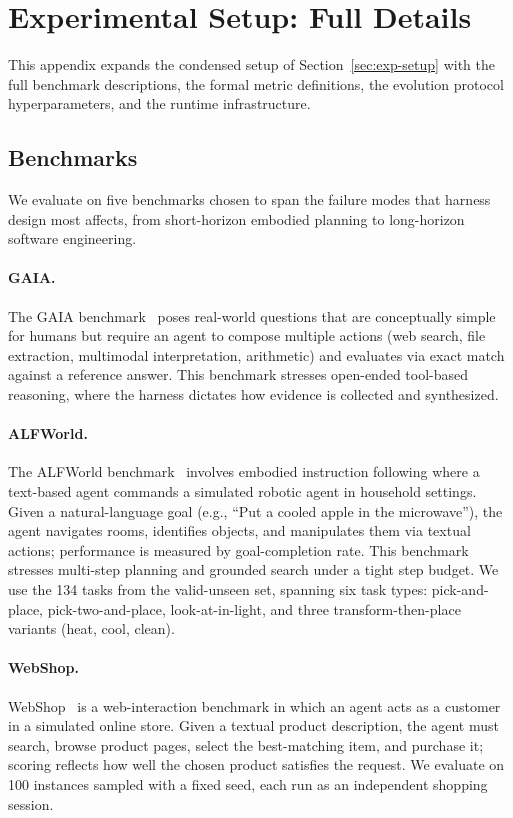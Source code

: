 \newcommand{\tbd}[1]{\textcolor{red}{#1}}


\section{Experimental Setup: Full Details}
\label{app:setup}

This appendix expands the condensed setup of Section~\ref{sec:exp-setup} with
the full benchmark descriptions, the formal metric definitions, the evolution
protocol hyperparameters, and the runtime infrastructure.

\subsection{Benchmarks}
\label{app:benchmarks}

We evaluate on five benchmarks chosen to span the failure modes that harness
design most affects, from short-horizon embodied planning to long-horizon
software engineering. 


\paragraph{GAIA.} The GAIA benchmark~\cite{mialon2024gaia} poses real-world questions that are conceptually simple for humans but require an agent to compose multiple actions (web search, file extraction, multimodal interpretation, arithmetic) and evaluates via exact match against a reference answer. This benchmark stresses open-ended tool-based reasoning, where the harness dictates how evidence is collected and synthesized.

\paragraph{ALFWorld.} The ALFWorld benchmark~\cite{shridhar2020alfworld} involves embodied instruction following where a text-based agent commands a simulated robotic agent in household settings. Given a natural-language goal (e.g., ``Put a cooled apple in the microwave''), the agent navigates rooms, identifies objects, and manipulates them via textual actions; performance is measured by goal-completion rate. This benchmark stresses multi-step planning and grounded search under a tight step budget. We use the 134 tasks from the valid-unseen set, spanning six task types: pick-and-place, pick-two-and-place, look-at-in-light, and three transform-then-place variants (heat, cool, clean).

\paragraph{WebShop.} WebShop~\cite{yao2022webshop} is a web-interaction benchmark in which an agent acts as a customer in a simulated online store. Given a textual product description, the agent must search, browse product pages, select the best-matching item, and purchase it; scoring reflects how well the chosen product satisfies the request. We evaluate on 100 instances sampled with a fixed seed, each run as an independent shopping session.

